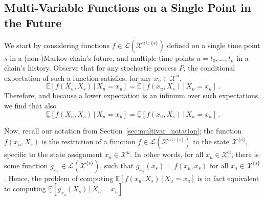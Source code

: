 \documentclass[10pt,a4paper]{paper}
\theoremstyle{definition}
\newcommand{\states}{\mathcal{X}}
\newcommand{\gambles}{\mathcal{L}}
\begin{document}
\subsection{Multi-Variable Functions on a Single Point in the Future}\label{sec:function_single_future_multiple_past}

We start by considering functions $f\in\gambles(\states^{u\cup\{s\}})$ defined on a single time point $s$ in a (non-)Markov chain's future, and multiple time points $u=t_0,\ldots,t_n$ in a chain's history. Observe that for any stochastic process $P$, the conditional expectation of such a function satisfies, for any $x_u\in\states^u$,
\begin{equation*}
\mathbb{E}[f(X_u,X_s)\,\vert\,X_u=x_u] = \mathbb{E}[f(x_u,X_s)\,\vert\,X_u=x_u]\,.
\end{equation*}
Therefore, and because a lower expectation is an infimum over such expectations, we find that also
\begin{equation*}
\underline{\mathbb{E}}[f(X_u,X_s)\,\vert\,X_u=x_u] = \underline{\mathbb{E}}[f(x_u,X_s)\,\vert\,X_u=x_u]\,.
\end{equation*}

Now, recall our notation from Section~\ref{sec:multivar_notation}; the function $f(x_u,X_s)$ is the restriction of a function $f\in\gambles(\states^{u\cup\{s\}})$ to the state $\states^{\{s\}}$, specific to the state assignment $x_u\in\states^u$. In other words, for all $x_u\in\states^u$, there is some function $g_{x_u}\in\gambles(\states^{\{s\}})$, such that $g_{x_u}(x_s)=f(x_u,x_s)$ for all $x_s\in\states^{\{s\}}$.
Hence, the problem of computing $\underline{\mathbb{E}}[f(x_u,X_s)\,\vert\,X_u=x_u]$ is in fact equivalent to computing $\underline{\mathbb{E}}[g_{x_u}(X_s)\,\vert\,X_u=x_u]$. 
\end{document}
